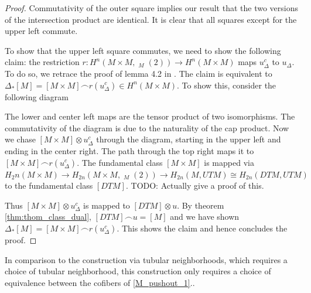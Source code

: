 \documentclass{scrartcl}
\theoremstyle{plain}
\theoremstyle{definition}
\newcommand{\capp}{\mathbin{\frown}}
\newcommand{\iso}{\cong}
\DeclareMathOperator{\cConf}{\overline{Conf}}
\begin{document}
\begin{proof}
    Commutativity of the outer square implies our result that the two versions of the intersection product are identical. It is clear that all squares except for the upper left commute. 

    To show that the upper left square commutes, we need to show the following claim: the restriction $r\colon H^n(M\times M, \cConf_M(2)) \to H^n(M\times M)$ maps $u_\Delta^c$ to $u_\Delta$. To do so, we retrace the proof of lemma 4.2 in \cite{hutchings2011cup}. The claim is equivalent to $\Delta_*[M] = [M\times M]\capp r(u^c_\Delta) \in H^n(M\times M)$. To show this, consider the following diagram
    \begin{center}
    \end{center}
    The lower and center left maps are the tensor product of two isomorphisms. The commutativity of the diagram is due to the naturality of the cap product. Now we chase $[M\times M]\otimes u_\Delta^c$ through the diagram, starting in the upper left and ending in the center right. The path through the top right maps it to $[M\times M]\capp r(u_\Delta^c)$. The fundamental class $[M\times M]$ is mapped via $H_2n(M\times M)\to H_{2n}(M\times M, \cConf_M(2))\to H_{2n}(M, UTM) \iso H_{2n}(DTM, UTM)$ to the fundamental class $[DTM]$. TODO: Actually give a proof of this.
    
    Thus $[M\times M]\otimes u_\Delta^c$ is mapped to $[DTM] \otimes u$. By theorem \ref{thm:thom_class_dual}, $[DTM] \capp u = [M]$ and we have shown $\Delta_*[M] = [M\times M]\capp r(u^c_\Delta)$. This shows the claim and hence concludes the proof.
\end{proof}


In comparison to the construction via tubular neighborhoods, which requires a choice of tubular neighborhood, this construction only requires a choice of equivalence between the cofibers of \cref{M_pushout_1}\nocite{*}..
\end{document}
